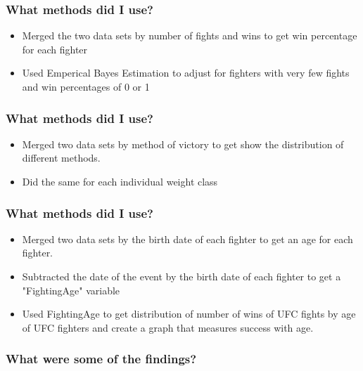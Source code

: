 \documentclass{beamer}
\begin{document}
\begin{frame}
\frametitle{What methods did I use?}
\begin{itemize}
    \item Merged the two data sets by number of fights and wins to get win percentage for each fighter
    \item Used Emperical Bayes Estimation to adjust for fighters with very few fights and win percentages of 0 or 1
\end{itemize}
\end{frame}

\begin{frame}
\frametitle{What methods did I use?}
\begin{itemize}
    \item Merged two data sets by method of victory to get show the distribution of different methods.
    \item Did the same for each individual weight class
\end{itemize}
\end{frame}

\begin{frame}
\frametitle{What methods did I use?}
\begin{itemize}
    \item Merged two data sets by the birth date of each fighter to get an age for each fighter.
    \item Subtracted the date of the event by the birth date of each fighter to get a "FightingAge" variable
    \item Used FightingAge to get distribution of number of wins of UFC fights by age of UFC fighters and create a graph that measures success with age.
\end{itemize}
\end{frame}


\begin{frame}
\frametitle{What were some of the findings?}
\begin{center}
\end{center}
\end{frame}
\end{document}
